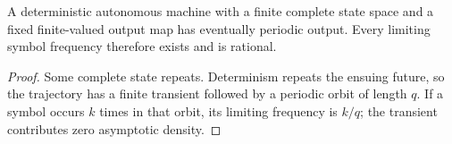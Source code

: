 \setcounter{theorem}{0}
\begin{proposition}
A deterministic autonomous machine with a finite complete state space and a fixed finite-valued output map has eventually periodic output. Every limiting symbol frequency therefore exists and is rational.
\end{proposition}
\begin{proof}
Some complete state repeats. Determinism repeats the ensuing future, so the trajectory has a finite transient followed by a periodic orbit of length $q$. If a symbol occurs $k$ times in that orbit, its limiting frequency is $k/q$; the transient contributes zero asymptotic density.
\end{proof}
